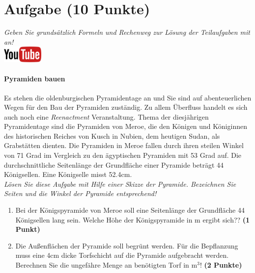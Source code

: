 \documentclass[a4paper, 10pt]{scrartcl}\usepackage[]{graphicx}\usepackage[]{xcolor}
\begin{document}
 
\clearpage

\section{Aufgabe \hfill (10 Punkte)}

\textit{Geben Sie grunds{\"a}tzlich Formeln und Rechenweg zur L{\"o}sung der
  Teilaufgaben mit an!} \\[1Ex]

\hfill\href{https://youtu.be/tDgr6fpkkYA}{\includegraphics[width =
  2cm]{img/youtube}} %
\hspace{2Ex}

\paragraph{Pyramiden bauen}



Es stehen die oldenburgischen Pyramidentage an und Sie sind auf
abenteuerlichen Wegen f{\"u}r den Bau der Pyramiden zust{\"a}ndig. Zu allem
{\"U}berfluss handelt es sich auch noch eine \textit{Reenactment}
Veranstaltung. Thema der diesj{\"a}hrigen Pyramidentage sind die Pyramiden von
Meroe, die den K{\"o}nigen und K{\"o}niginnen des historischen Reiches von Kusch in
Nubien, dem heutigen Sudan, als Grabst{\"a}tten dienten. Die Pyramiden in Meroe
fallen durch ihren steilen Winkel von 71 Grad im Vergleich zu
den {\"a}gyptischen Pyramiden mit 53 Grad auf. Die durchschnittliche
Seitenl{\"a}nge der Grundfl{\"a}che einer Pyramide betr{\"a}gt 44 K{\"o}nigsellen. Eine K{\"o}nigselle
misst 52.4cm.\\

\textit{L{\"o}sen Sie diese Aufgabe mit Hilfe einer Skizze der Pyramide. Bezeichnen
  Sie Seiten und die Winkel der Pyramide entsprechend!}

\begin{enumerate}
\item Bei der K{\"o}nigspyramide von Meroe soll eine Seitenl{\"a}nge der Grundfl{\"a}che
  44 K{\"o}nigsellen lang sein. Welche H{\"o}he der K{\"o}nigspyramide in m
  ergibt sich?? \textbf{(1 Punkt)}
\item Die Au{\ss}enfl{\"a}chen der Pyramide soll begr{\"u}nt werden. F{\"u}r die
  Bepflanzung muss eine 4cm dicke Torfschicht auf die
  Pyramide aufgebracht werden. Berechnen Sie die ungef{\"a}hre Menge an
  ben{\"o}tigten Torf in m$^3$! \textbf{(2 Punkte)}
\end{enumerate}
\end{document}

